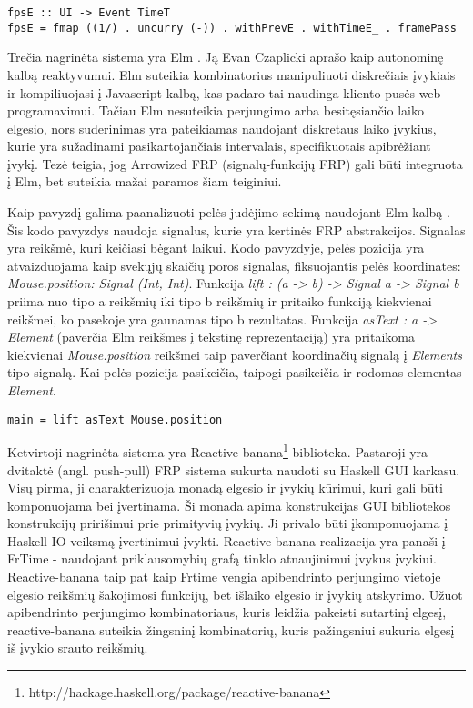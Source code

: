 \begin{lstlisting}[caption=- Reactive kodo pavyzdys, label=Reactive]
fpsE :: UI -> Event TimeT
fpsE = fmap ((1/) . uncurry (-)) . withPrevE . withTimeE_ . framePass
\end{lstlisting}

Trečia nagrinėta sistema yra Elm \cite{Czaplicki:2013:AFR:2499370.2462161}. Ją Evan Czaplicki  aprašo kaip autonominę kalbą reaktyvumui. Elm suteikia kombinatorius manipuliuoti diskrečiais įvykiais ir kompiliuojasi į Javascript kalbą, kas padaro tai naudinga kliento pusės web programavimui. Tačiau Elm nesuteikia perjungimo arba besitęsiančio laiko elgesio, nors suderinimas yra pateikiamas naudojant diskretaus laiko įvykius, kurie yra sužadinami pasikartojančiais intervalais, specifikuotais apibrėžiant įvykį. Tezė teigia, jog Arrowized FRP (signalų-funkcijų FRP) gali būti integruota į Elm, bet suteikia mažai paramos šiam teiginiui.

Kaip pavyzdį galima paanalizuoti pelės judėjimo sekimą naudojant Elm kalbą \cite{Elm}. Šis kodo pavyzdys naudoja signalus, kurie yra kertinės FRP abstrakcijos. Signalas yra reikšmė, kuri keičiasi bėgant laikui. Kodo pavyzdyje, pelės pozicija yra atvaizduojama kaip svekųjų skaičių poros signalas, fiksuojantis pelės koordinates: \textit{Mouse.position: Signal (Int, Int)}. Funkcija \textit{lift : (a -> b) -> Signal a -> Signal b} priima nuo tipo a reikšmių iki tipo b reikšmių ir pritaiko funkciją kiekvienai reikšmei, ko pasekoje yra gaunamas tipo b rezultatas. Funkcija \textit{asText : a -> Element} (paverčia Elm reikšmes į tekstinę reprezentaciją) yra pritaikoma kiekvienai \textit{Mouse.position} reikšmei taip paverčiant koordinačių signalą į \textit{Elements} tipo signalą. Kai pelės pozicija pasikeičia, taipogi pasikeičia ir rodomas elementas \textit{Element}.

\begin{lstlisting}[caption=- Pelės judėjimo sekimas (Elm), label=Elm]
	main = lift asText Mouse.position
\end{lstlisting}

Ketvirtoji nagrinėta sistema yra Reactive-banana\footnote{http://hackage.haskell.org/package/reactive-banana} biblioteka. Pastaroji yra dvitaktė (angl. push-pull) FRP sistema sukurta naudoti su Haskell GUI karkasu. Visų pirma, ji charakterizuoja monadą elgesio ir įvykių kūrimui, kuri gali būti komponuojama bei įvertinama. Ši monada apima konstrukcijas GUI bibliotekos konstrukcijų pririšimui prie primityvių įvykių. Ji privalo būti įkomponuojama į Haskell IO veiksmą įvertinimui įvykti. Reactive-banana realizacija yra panaši į FrTime - naudojant priklausomybių grafą tinklo atnaujinimui įvykus įvykiui. Reactive-banana taip pat kaip Frtime vengia apibendrinto perjungimo vietoje elgesio reikšmių šakojimosi funkcijų, bet išlaiko elgesio ir įvykių atskyrimo. Užuot apibendrinto perjungimo kombinatoriaus, kuris leidžia pakeisti sutartinį elgesį, reactive-banana suteikia žingsninį kombinatorių, kuris pažingsniui sukuria elgesį iš įvykio srauto reikšmių.

